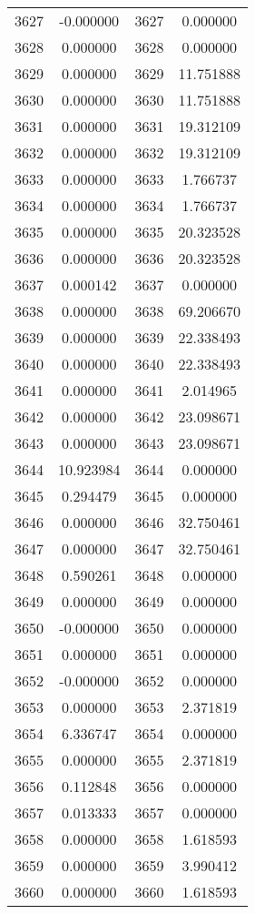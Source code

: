 \documentclass[12pt]{article}
\begin{document}
\begin{longtable}{@{}cccc@{}}
3627 & -0.000000 & 3627 & 0.000000 \\
3628 & 0.000000 & 3628 & 0.000000 \\
3629 & 0.000000 & 3629 & 11.751888 \\
3630 & 0.000000 & 3630 & 11.751888 \\
3631 & 0.000000 & 3631 & 19.312109 \\
3632 & 0.000000 & 3632 & 19.312109 \\
3633 & 0.000000 & 3633 & 1.766737 \\
3634 & 0.000000 & 3634 & 1.766737 \\
3635 & 0.000000 & 3635 & 20.323528 \\
3636 & 0.000000 & 3636 & 20.323528 \\
3637 & 0.000142 & 3637 & 0.000000 \\
3638 & 0.000000 & 3638 & 69.206670 \\
3639 & 0.000000 & 3639 & 22.338493 \\
3640 & 0.000000 & 3640 & 22.338493 \\
3641 & 0.000000 & 3641 & 2.014965 \\
3642 & 0.000000 & 3642 & 23.098671 \\
3643 & 0.000000 & 3643 & 23.098671 \\
3644 & 10.923984 & 3644 & 0.000000 \\
3645 & 0.294479 & 3645 & 0.000000 \\
3646 & 0.000000 & 3646 & 32.750461 \\
3647 & 0.000000 & 3647 & 32.750461 \\
3648 & 0.590261 & 3648 & 0.000000 \\
3649 & 0.000000 & 3649 & 0.000000 \\
3650 & -0.000000 & 3650 & 0.000000 \\
3651 & 0.000000 & 3651 & 0.000000 \\
3652 & -0.000000 & 3652 & 0.000000 \\
3653 & 0.000000 & 3653 & 2.371819 \\
3654 & 6.336747 & 3654 & 0.000000 \\
3655 & 0.000000 & 3655 & 2.371819 \\
3656 & 0.112848 & 3656 & 0.000000 \\
3657 & 0.013333 & 3657 & 0.000000 \\
3658 & 0.000000 & 3658 & 1.618593 \\
3659 & 0.000000 & 3659 & 3.990412 \\
3660 & 0.000000 & 3660 & 1.618593 \\

\end{longtable}
\end{document}
